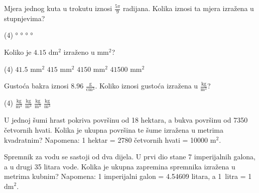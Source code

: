 \begin{zadatak}
	Mjera jednog kuta u trokutu iznosi $\displaystyle \frac{5\pi}{9}$ radijana.
	Kolika iznosi ta mjera izražena u stupnjevima?
    \begin{tasks}(4)
		°
		°
		°
		°
	\end{tasks}
\end{zadatak}

\pagebreak

\begin{zadatak}
	Koliko je $4.15$ dm$^2$ izraženo u mm$^2$?
    \begin{tasks}(4)
		\task $41.5$ mm$^2$
		\task $415$ mm$^2$
		\task $4150$ mm$^2$
		\task $41500$ mm$^2$
	\end{tasks}
\end{zadatak}

\begin{zadatak}
	Gustoća bakra iznosi 8.96 $\displaystyle \frac{\text{g}}{\text{cm}^3}$.
	Koliko iznosi gustoća izražena u $\displaystyle \frac{\text{kg}}{\text{m}^3}$?
    \begin{tasks}(4)
		 $\displaystyle \frac{\text{kg}}{\text{m}^3}$
		 $\displaystyle \frac{\text{kg}}{\text{m}^3}$
		 $\displaystyle \frac{\text{kg}}{\text{m}^3}$
		 $\displaystyle \frac{\text{kg}}{\text{m}^3}$
	\end{tasks}
\end{zadatak}

\begin{zadatak}
	U jednoj šumi hrast pokriva površinu od 18 hektara, a bukva površinu od 7350 četvornih hvati.
	Kolika je ukupna površina te šume izražena u metrima kvadratnim?
	Napomena: 1 hektar = 2780 četvornih hvati = 10000 $\text{m}^2$.
\end{zadatak}

\begin{zadatak}
	Spremnik za vodu se sastoji od dva dijela.
	U prvi dio stane 7 imperijalnih galona, a u  drugi 35 litara vode.
	Kolika je ukupna zapremina spremnika izražena u metrima kubnim?
	Napomena: 1 imperijalni galon = 4.54609 litara, a 1~litra = 1~$\text{dm}^2$.
\end{zadatak}

\newpage